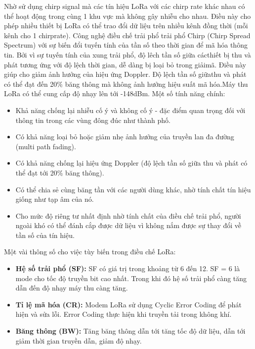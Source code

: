 \indent Nhờ sử dụng chirp signal mà các tín hiệu LoRa với các chirp rate khác nhau có thể hoạt động trong cùng 1 khu vực mà không gây nhiễu cho nhau. Điều này cho phép nhiều thiết bị LoRa có thể trao đổi dữ liệu trên nhiều kênh đồng thời (mỗi kênh cho 1 chirprate). Công nghệ điều chế trải phổ trải phổ Chirp (Chirp Spread Spectrum) với sự biến đổi tuyến tính của tần số theo thời gian để mã hóa thông tin. Bởi vì sự tuyến tính của xung trải phổ, độ lêch tần số giữa cácthiết bị thu và phát tương ứng với độ lệch thời gian, dễ dàng bị loại bỏ trong giảimã. Điều này giúp cho giảm ảnh hưởng của hiệu ứng Doppler. Độ lệch tần số giữathu và phát có thể đạt đến 20\% băng thông mà không ảnh hưởng hiệu suất mã hóa.Máy thu LoRa có thể cung cấp độ nhạy lên tới -148dBm. Một số tính năng chính:
\begin{itemize}
	\item Khả năng chống lại nhiễu cố ý và không cố ý - đặc điểm quan trọng đối với thông tin trong các vùng đông đúc như thành phố.
	\item Có khả năng loại bỏ hoặc giảm nhẹ ảnh hưởng của truyền lan đa đường (multi path fading).
	\item Có khả năng chống lại hiệu ứng Doppler (độ lệch tần số giữa thu và phát có thể đạt tới 20\% băng thông).
	\item Có thể chia sẻ cùng băng tần với các người dùng khác, nhờ tính chất tín hiệu giống như tạp âm của nó.
	\item Cho mức độ riêng tư nhất định nhờ tính chất của điều chế trải phổ, người ngoài khó có thể đánh cắp được dữ liệu vì không nắm được sự thay đổi về tần số của tín hiệu.
\end{itemize}

\indent Một vài thông số cho việc tùy biến trong điều chế LoRa:
\begin{itemize}
	\item \textbf{Hệ số trải phổ (SF):} SF có giá trị trong khoảng từ 6 đến 12. SF = 6 là mode cho tốc độ truyền bit cao nhất. Trong khi đó hệ số trải phổ càng tăng dẫn đến độ nhạy máy thu càng tăng.
	\item \textbf{Tỉ lệ mã hóa (CR):} Modem LoRa sử dụng Cyclic Error Coding để phát hiện và sửa lỗi. Error Coding thực hiện khi truyền tải trong không khí.
	\item \textbf{Băng thông (BW):} Tăng băng thông dẫn tới tăng tốc độ dữ liệu, dẫn tới giảm thời gian truyền dẫn, giảm độ nhạy.
\end{itemize}
